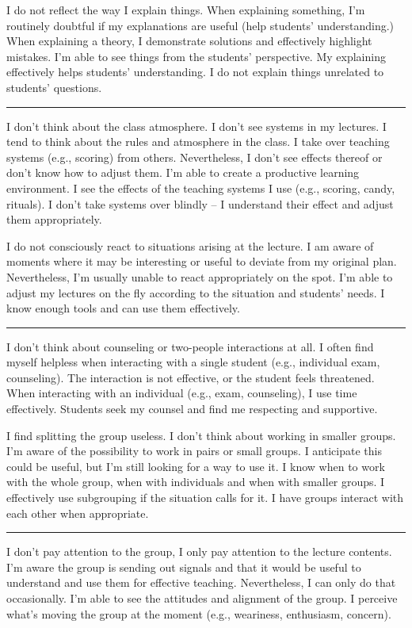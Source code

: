 \newpage
{}
{I do not reflect the way I explain things.}
{When explaining something, I'm routinely doubtful if my explanations are useful (help students' understanding.)}
{When explaining a theory, I demonstrate solutions and effectively highlight mistakes. I'm able to see things from the students' perspective. My explaining effectively helps students' understanding. I do not explain things unrelated to students' questions.}

\rule{\textwidth}{0.4pt}
{I don't think about the class atmosphere. I don't see systems in my lectures.}
{I tend to think about the rules and atmosphere in the class. I take over teaching systems (e.g., scoring) from others. Nevertheless, I don't see effects thereof or don't know how to adjust them.}
{I'm able to create a productive learning environment. I see the effects of the teaching systems I use (e.g., scoring, candy, rituals). I don't take systems over blindly -- I understand their effect and adjust them appropriately.}

\newpage
{}
{I do not consciously react to situations arising at the lecture.}
{I am aware of moments where it may be interesting or useful to deviate from my original plan. Nevertheless, I'm usually unable to react appropriately on the spot.}
{I'm able to adjust my lectures on the fly according to the situation and students' needs. I know enough tools and can use them effectively.}

\rule{\textwidth}{0.4pt}
{I don't think about counseling or two-people interactions at all.}
{I often find myself helpless when interacting with a single student (e.g., individual exam, counseling). The interaction is not effective, or the student feels threatened.}
{When interacting with an individual (e.g., exam, counseling), I use time effectively. Students seek my counsel and find me respecting and supportive.}

\newpage
{}
{I find splitting the group useless. I don't think about working in smaller groups.}
{I'm aware of the possibility to work in pairs or small groups. I anticipate this could be useful, but I'm still looking for a way to use it.}
{I know when to work with the whole group, when with individuals and when with smaller groups. I effectively use subgrouping if the situation calls for it. I have groups interact with each other when appropriate.}

\rule{\textwidth}{0.4pt}
{I don't pay attention to the group, I only pay attention to the lecture contents.}
{I'm aware the group is sending out signals and that it would be useful to understand and use them for effective teaching. Nevertheless, I can only do that occasionally.}
{I'm able to see the attitudes and alignment of the group. I perceive what's moving the group at the moment (e.g., weariness, enthusiasm, concern).}
